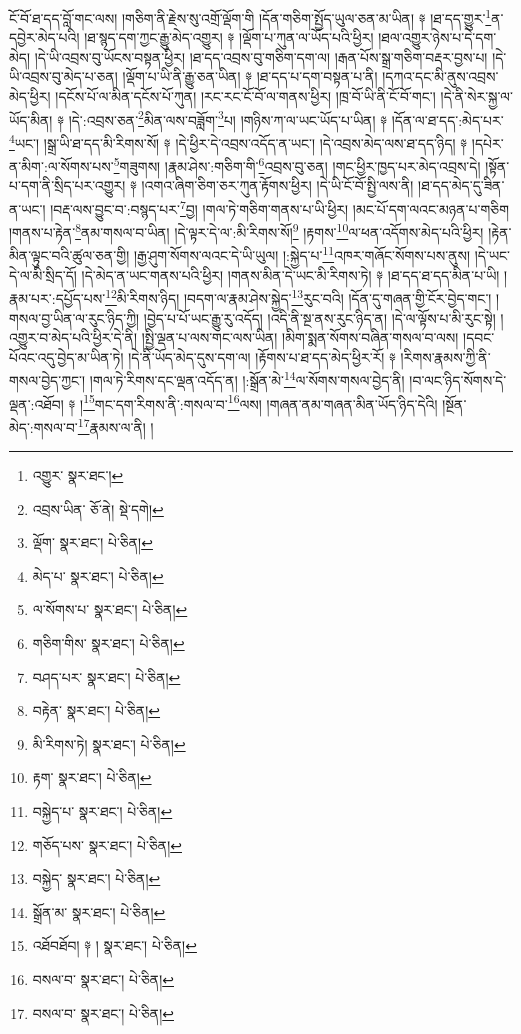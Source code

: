 ངོ་བོ་ཐ་དད་བློ་གང་ལས། །གཅིག་ནི་རྗེས་སུ་འགྲོ་ལྡོག་གི །དོན་གཅིག་སྤྱོད་ཡུལ་ཅན་མ་ཡིན། ༈ །ཐ་དད་གྱུར་\footnote{འགྱུར་  སྣར་ཐང་། }ན་དབྱེར་མེད་པའི། །ཐ་སྙད་དག་ཀྱང་རྒྱུ་མེད་འགྱུར། ༈ །ལྡོག་པ་ཀུན་ལ་ཡོད་པའི་ཕྱིར། །ཐལ་འགྱུར་ཉེས་པ་དེ་དག་མེད། །དེ་ཡི་འབྲས་བུ་ཡོངས་བསྟན་ཕྱིར། །ཐ་དད་འབྲས་བུ་གཅིག་དག་ལ། །རྒན་པོས་སྒྲ་གཅིག་བརྡར་བྱས་པ། །དེ་ཡི་འབྲས་བུ་མེད་པ་ཅན། །ལྡོག་པ་ཡི་ནི་རྒྱུ་ཅན་ཡིན། ༈ །ཐ་དད་པ་དག་བསྟན་པ་ནི། །དཀའ་དང་མི་ནུས་འབྲས་མེད་ཕྱིར། །དངོས་པོ་ལ་མིན་དངོས་པོ་ཀུན། །རང་རང་ངོ་བོ་ལ་གནས་ཕྱིར། །ཁྲ་བོ་ཡི་ནི་ངོ་བོ་གང་། །དེ་ནི་སེར་སྐྱ་ལ་ཡོད་མིན། ༈ །དེ་:འབྲས་ཅན་\footnote{འབྲས་ཡིན་  ཅོ་ནེ།  སྡེ་དགེ། }མིན་ལས་བཟློག་\footnote{ལྡོག་  སྣར་ཐང་།  པེ་ཅིན། }པ། །གཉིས་ཀ་ལ་ཡང་ཡོད་པ་ཡིན། ༈ །དོན་ལ་ཐ་དད་:མེད་པར་\footnote{མེད་པ་  སྣར་ཐང་།  པེ་ཅིན། }ཡང་། །སྒྲ་ཡི་ཐ་དད་མི་རིགས་སོ། ༈ །དེ་ཕྱིར་དེ་འབྲས་འདོད་ན་ཡང་། །དེ་འབྲས་མེད་ལས་ཐ་དད་ཉིད། ༈ །དཔེར་ན་མིག་:ལ་སོགས་པས་\footnote{ལ་སོགས་པ་  སྣར་ཐང་།  པེ་ཅིན། }གཟུགས། །རྣམ་ཤེས་:གཅིག་གི་\footnote{གཅིག་གིས་  སྣར་ཐང་།  པེ་ཅིན། }འབྲས་བུ་ཅན། །གང་ཕྱིར་ཁྱད་པར་མེད་འབྲས་དེ། །སྟོན་པ་དག་ནི་སྲིད་པར་འགྱུར། ༈ །འགའ་ཞིག་ཅིག་ཅར་ཀུན་རྟོགས་ཕྱིར། །དེ་ཡི་ངོ་བོ་སྤྱི་ལས་ནི། །ཐ་དད་མེད་དུ་ཟིན་ན་ཡང་། །བརྡ་ལས་བྱུང་བ་:བསྙད་པར་\footnote{བཤད་པར་  སྣར་ཐང་།  པེ་ཅིན། }བྱ། །གལ་ཏེ་གཅིག་གནས་པ་ཡི་ཕྱིར། །མང་པོ་དག་ལའང་མཉན་པ་གཅིག །གནས་པ་རྟེན་\footnote{བརྟེན་  སྣར་ཐང་།  པེ་ཅིན། }ནམ་གསལ་བ་ཡིན། །དེ་ལྟར་དེ་ལ་:མི་རིགས་སོ།\footnote{མི་རིགས་ཏེ།  སྣར་ཐང་།  པེ་ཅིན། } །རྟགས་\footnote{རྟག་  སྣར་ཐང་།  པེ་ཅིན། }ལ་ཕན་འདོགས་མེད་པའི་ཕྱིར། །རྟེན་མིན་ལྟུང་བའི་ཚུལ་ཅན་གྱི། །རྒྱ་ཤུག་སོགས་ལའང་དེ་ཡི་ཡུལ། །:སྐྱེད་པ་\footnote{བསྐྱེད་པ་  སྣར་ཐང་།  པེ་ཅིན། }འཁར་གཞོང་སོགས་པས་ནུས། །དེ་ཡང་དེ་ལ་མི་སྲིད་དོ། །དེ་མེད་ན་ཡང་གནས་པའི་ཕྱིར། །གནས་མིན་དེ་ཡང་མི་རིགས་ཏེ། ༈ །ཐ་དད་ཐ་དད་མིན་པ་ཡི། །རྣམ་པར་:དཔྱོད་པས་\footnote{གཅོད་པས་  སྣར་ཐང་།  པེ་ཅིན། }མི་རིགས་ཉིད། །བདག་ལ་རྣམ་ཤེས་སྐྱེད་\footnote{བསྐྱེད་  སྣར་ཐང་།  པེ་ཅིན། }རུང་བའི། །དོན་དུ་གཞན་གྱི་ངོར་བྱེད་གང་། །གསལ་བྱ་ཡིན་ལ་རུང་ཉིད་ཀྱི། །བྱེད་པ་པོ་ཡང་རྒྱུ་རུ་འདོད། །འདི་ནི་སྔ་ནས་རུང་ཉིད་ན། །དེ་ལ་ལྟོས་པ་མི་རུང་སྟེ། །འགྱུར་བ་མེད་པའི་ཕྱིར་དེ་ནི། །སྤྱི་ལྡན་པ་ལས་གང་ལས་ཡིན། །མིག་སྨན་སོགས་བཞིན་གསལ་བ་ལས། །དབང་པོའང་འདུ་བྱེད་མ་ཡིན་ཏེ། །དེ་ནི་ཡོད་མེད་དུས་དག་ལ། །རྟོགས་པ་ཐ་དད་མེད་ཕྱིར་རོ། ༈ །རིགས་རྣམས་ཀྱི་ནི་གསལ་བྱེད་ཀྱང་། །གལ་ཏེ་རིགས་དང་ལྡན་འདོད་ན། །:སྒྲོན་མེ་\footnote{སྒྲོན་མ་  སྣར་ཐང་།  པེ་ཅིན། }ལ་སོགས་གསལ་བྱེད་ནི། །བ་ལང་ཉིད་སོགས་དེ་ལྡན་:འཐོབ། ༈ །\footnote{འཐོབཐོབ། ༈ །  སྣར་ཐང་།  པེ་ཅིན། }གང་དག་རིགས་ནི་:གསལ་བ་\footnote{བསལ་བ་  སྣར་ཐང་།  པེ་ཅིན། }ལས། །གཞན་ནམ་གཞན་མིན་ཡོད་ཉིད་དེའི། །སྔོན་མེད་:གསལ་བ་\footnote{བསལ་བ་  སྣར་ཐང་།  པེ་ཅིན། }རྣམས་ལ་ནི། །
